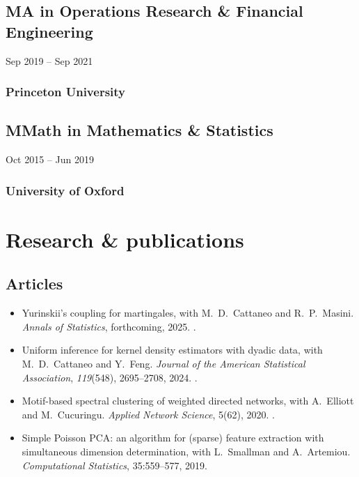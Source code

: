 \documentclass{wgu-cv}
\begin{document}
\subsection{MA in Operations Research \& Financial Engineering}
{Sep 2019 -- Sep 2021}
\subsubsection{Princeton University}

\subsection{MMath in Mathematics \& Statistics}
{Oct 2015 -- Jun 2019}
\subsubsection{University of Oxford}

\pagebreak

\section{Research \& publications}

\subsection{Articles}{}
\begin{itemize}

  \item Yurinskii's coupling for martingales,
    with M.\ D.\ Cattaneo and R.\ P.\ Masini.
    \emph{Annals of Statistics}, forthcoming, 2025.
    .

  \item Uniform inference for kernel density estimators with dyadic data,
    with M.\ D.\ Cattaneo and Y.\ Feng.
    \emph{Journal of the American Statistical Association},
    \emph{119}(548), 2695--2708, 2024.
    .

  \item Motif-based spectral clustering of weighted directed networks,
    with A.\ Elliott and M.\ Cucuringu.
    \emph{Applied Network Science}, 5(62), 2020.
    .

  \item Simple Poisson PCA: an algorithm for (sparse) feature extraction
    with simultaneous dimension determination,
    with L.\ Smallman and A.\ Artemiou.
    \emph{Computational Statistics}, 35:559--577, 2019.

\end{itemize}
\end{document}
